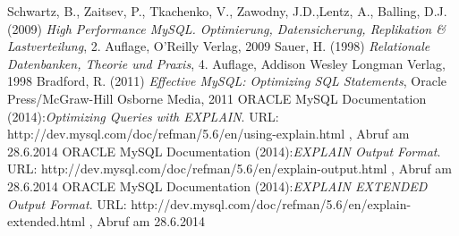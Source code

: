 \newpage
{}
  \begin{thebibliography}{}



     Schwartz, B., Zaitsev, P., Tkachenko, V., Zawodny, J.D.,Lentz, A., Balling, D.J. (2009) 
        {\sl High Performance MySQL. Optimierung, Datensicherung, Replikation \& Lastverteilung}, 2. Auflage,  O'Reilly Verlag, 2009
     Sauer, H. (1998) {\sl Relationale Datenbanken, Theorie und Praxis}, 4. Auflage, Addison Wesley Longman Verlag, 1998
     Bradford, R. (2011) {\sl Effective MySQL: Optimizing SQL Statements}, Oracle Press/McGraw-Hill Osborne Media, 2011
    ORACLE MySQL Documentation (2014):{\sl Optimizing Queries with EXPLAIN}. URL: http://dev.mysql.com/doc/refman/5.6/en/using-explain.html , Abruf am 28.6.2014
    ORACLE MySQL Documentation (2014):{\sl EXPLAIN Output Format}. URL: http://dev.mysql.com/doc/refman/5.6/en/explain-output.html , Abruf am 28.6.2014
	ORACLE MySQL Documentation (2014):{\sl EXPLAIN EXTENDED Output Format}. URL:
	http://dev.mysql.com/doc/refman/5.6/en/explain-extended.html , Abruf am 28.6.2014

  \end{thebibliography}
